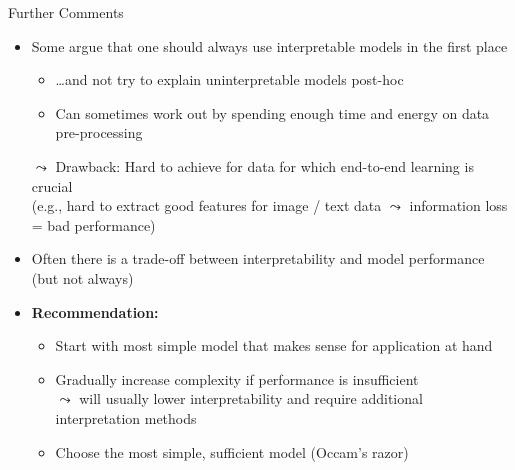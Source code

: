 \documentclass[11pt,compress,t,notes=noshow, aspectratio=169, xcolor=table]{beamer}
\begin{document}
\begin{frame}{Further Comments}

    \begin{itemize}
    \itemsep1em
        \item Some argue that one should always use interpretable models in the first place 
        \begin{itemize}
            \item \ldots and not try to explain uninterpretable models post-hoc
            \item Can sometimes work out by spending enough time and energy on data pre-processing %
        \end{itemize}
       \item[$\leadsto$] Drawback: Hard to achieve for data for which end-to-end learning is crucial\\ 
        (e.g., hard to extract good features for image / text data $\leadsto$ information loss = bad performance)
        \item Often there is a trade-off between interpretability and model performance (but not always)
        \pause
        \item \textbf{Recommendation:}
        \begin{itemize}
            \item Start with most simple model that makes sense for application at hand
            \item Gradually increase complexity if performance is insufficient\\
            $\leadsto$ will usually lower interpretability and require additional interpretation methods
            \item Choose the most simple, sufficient model (Occam's razor)
        \end{itemize} 
    \end{itemize}

\end{frame}


\endlecture
\end{document}
